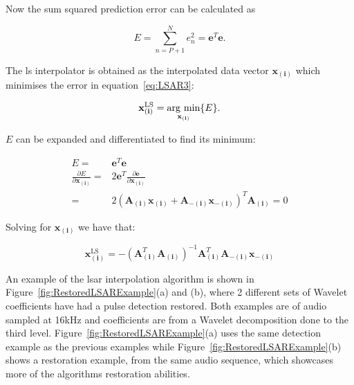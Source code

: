 Now the sum squared prediction error can be calculated as

\begin{equation}\label{eq:LSAR3}
  E = \sum^N_{n=P+1} e^2_n = \mathbf{e}^T\mathbf{e}.
\end{equation}

The \DIFdelbegin {}\DIFdelend \DIFaddbegin \gls{ls} \DIFaddend interpolator is obtained as the interpolated data vector $\mathbf{x}_{\mathbf{(i)}}$ which minimises the error in equation~\ref{eq:LSAR3}:

\begin{equation}\label{eq:LSAR4}
  \mathbf{x}^{\mathrm{LS}}_{\mathbf{(i)}} = \underset{\mathbf{x}_{\mathbf{(i)}}}{\mathrm{arg~min}} \{ E \}.
\end{equation}

$E$ can be expanded and differentiated to find its minimum:

\begin{align}\label{eq:LSAR5}
  E = & \mathbf{e}^T\mathbf{e} \\
  \frac{\partial E}{\partial \mathbf{x}_{\mathbf{(i)}}} = & 2\mathbf{e}^T \frac{\partial \mathbf{e}}{\partial \mathbf{x}_{\mathbf{(i)}}} \\
   = & 2 (\mathbf{A}_{\mathbf{(i)}} \mathbf{x}_{\mathbf{(i)}} + \mathbf{A}_{\mathbf{-(i)}}\mathbf{x}_{\mathbf{-(i)}})^T \mathbf{A}_{\mathbf{(i)}} = 0
\end{align}

Solving for $\mathbf{x}_{\mathbf{(i)}}$ we have that:

\begin{equation}\label{eq:LSAR6}
  \mathbf{x}^{\mathrm{LS}}_{\mathbf{(i)}} = - (\mathbf{A}_{\mathbf{(i)}}^T \mathbf{A}_{\mathbf{(i)}} )^{-1}\mathbf{A}_{\mathbf{(i)}}^T\mathbf{A}_{\mathbf{-(i)}}\mathbf{x}_{\mathbf{-(i)}}
\end{equation}

An example of the \DIFdelbegin {}\DIFdelend \DIFaddbegin \gls{lsar} \DIFaddend interpolation algorithm is shown in Figure~\ref{fig:RestoredLSARExample}(a) and (b), where 2 different sets of Wavelet coefficients have had a pulse detection restored. Both examples are of audio sampled at 16kHz and coefficients are from a Wavelet decomposition done to the third level. Figure~\ref{fig:RestoredLSARExample}(a) uses the same detection example as the previous examples while  Figure~\ref{fig:RestoredLSARExample}(b) shows a restoration example, from the same audio sequence, which showcases more of the algorithms restoration abilities.

